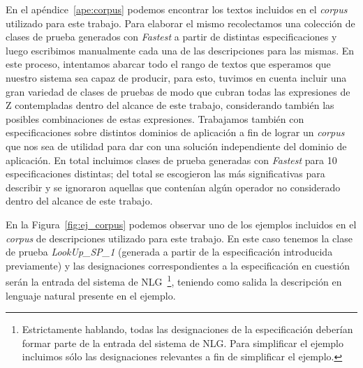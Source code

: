 En el apéndice~\ref{ape:corpus} podemos encontrar los textos incluidos en el \emph{corpus} utilizado para este trabajo. Para elaborar el mismo recolectamos una colección de clases de prueba generados con \emph{Fastest} a partir de distintas especificaciones y luego escribimos manualmente cada una de las descripciones para las mismas. En este proceso, intentamos abarcar todo el rango de textos que esperamos que nuestro sistema sea capaz de producir, para esto, tuvimos en cuenta incluir una gran variedad de clases de pruebas de modo que cubran todas las expresiones de Z contempladas dentro del alcance de este trabajo, considerando también las posibles combinaciones de estas expresiones. Trabajamos también con especificaciones sobre distintos dominios de aplicación a fin de lograr un \emph{corpus} que nos sea de utilidad para dar con una solución independiente del dominio de aplicación. En total incluimos clases de prueba generadas con \emph{Fastest} para 10 especificaciones distintas; del total se escogieron las más significativas para describir y se ignoraron aquellas que contenían algún operador no considerado dentro del alcance de este trabajo.


En la Figura~\ref{fig:ej_corpus} podemos observar uno de los ejemplos incluidos en el \emph{corpus} de descripciones utilizado para este trabajo. En este caso tenemos la clase de prueba \emph{LookUp\_SP\_1} (generada a partir de la especificación introducida previamente) y las designaciones correspondientes a la especificación en cuestión serán la entrada del sistema de NLG~\footnote{Estrictamente hablando, todas las designaciones de la especificación deberían formar parte de la entrada del sistema de NLG. Para simplificar el ejemplo incluimos sólo las designaciones relevantes a fin de simplificar el ejemplo.}, teniendo como salida la descripción en lenguaje natural presente en el ejemplo.

